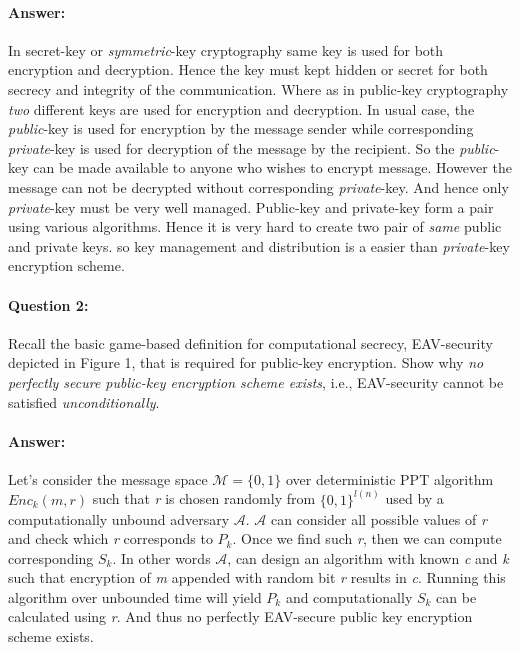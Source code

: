 \documentclass{article}
\begin{document}
    \paragraph{Answer: \newline}
        In secret-key or \emph{symmetric}-key cryptography same key is used for both encryption and decryption. Hence the key must kept hidden or secret for both secrecy and integrity of the communication. \newline
        Where as in public-key cryptography \emph{two} different keys are used for encryption and decryption. In usual case, the \emph{public}-key is used for encryption by the message sender while corresponding \emph{private}-key is used for decryption of the message by the recipient. So the \emph{public}-key can be made available to anyone who wishes to encrypt message. However the message can not be decrypted without corresponding \emph{private}-key. And hence only \emph{private}-key must be very well managed.\newline
        Public-key and private-key form a pair using various algorithms. Hence it is very hard to create two pair of \emph{same} public and private keys. so key management and distribution is a easier than \emph{private}-key encryption scheme.
        
    \paragraph{Question 2:} Recall the basic game-based definition for computational secrecy, EAV-security depicted in Figure 1, that is required for public-key encryption. Show why \emph{no perfectly secure public-key encryption scheme exists}, i.e., EAV-security cannot be satisfied \emph{unconditionally}.
    \paragraph{Answer: \newline}
           Let's consider the message space ${\mathcal{M}=\{0,1\}}$ over deterministic PPT algorithm $Enc_k{(m,r)}$ such that \emph{r} is chosen randomly from ${\{0,1\}}^{l(n)}$ used by a computationally unbound adversary $\mathcal{A}$. $\mathcal{A}$ can consider
           all possible values of \emph{r} and check which \emph{r} corresponds to $P_k$. Once we find such \emph{r}, then we can compute corresponding $S_k$.\newline
           In other words $\mathcal{A}$, can design an algorithm with known \emph{c} and \emph{k} such that encryption of \emph{m} appended with random bit \emph{r} results in \emph{c}. Running this algorithm over unbounded time will yield $P_k$ and computationally $S_k$ can be calculated using \emph{r}. And thus no perfectly EAV-secure public key encryption scheme exists.
           
\end{document}
